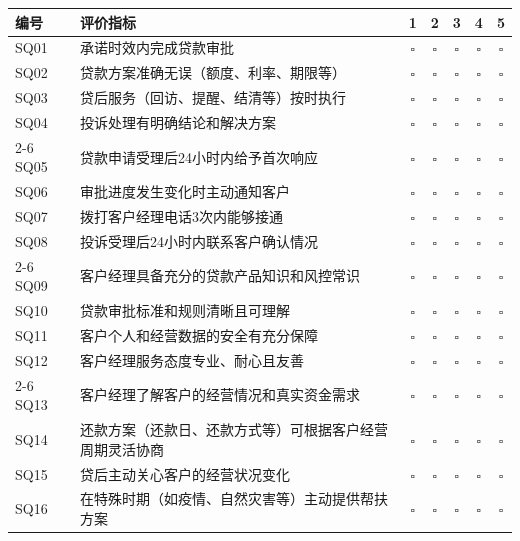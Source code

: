 \begin{center}
\begin{tabularx}{\textwidth}{l X c c c c c}
  \toprule
  \textbf{编号} & \textbf{评价指标} & \textbf{1} & \textbf{2} & \textbf{3} & \textbf{4} & \textbf{5} \\
  \midrule
  SQ01 & 承诺时效内完成贷款审批 & $\square$ & $\square$ & $\square$ & $\square$ & $\square$ \\
  SQ02 & 贷款方案准确无误（额度、利率、期限等） & $\square$ & $\square$ & $\square$ & $\square$ & $\square$ \\
  SQ03 & 贷后服务（回访、提醒、结清等）按时执行 & $\square$ & $\square$ & $\square$ & $\square$ & $\square$ \\
  SQ04 & 投诉处理有明确结论和解决方案 & $\square$ & $\square$ & $\square$ & $\square$ & $\square$ \\
  \cmidrule{2-6}
  SQ05 & 贷款申请受理后24小时内给予首次响应 & $\square$ & $\square$ & $\square$ & $\square$ & $\square$ \\
  SQ06 & 审批进度发生变化时主动通知客户 & $\square$ & $\square$ & $\square$ & $\square$ & $\square$ \\
  SQ07 & 拨打客户经理电话3次内能够接通 & $\square$ & $\square$ & $\square$ & $\square$ & $\square$ \\
  SQ08 & 投诉受理后24小时内联系客户确认情况 & $\square$ & $\square$ & $\square$ & $\square$ & $\square$ \\
  \cmidrule{2-6}
  SQ09 & 客户经理具备充分的贷款产品知识和风控常识 & $\square$ & $\square$ & $\square$ & $\square$ & $\square$ \\
  SQ10 & 贷款审批标准和规则清晰且可理解 & $\square$ & $\square$ & $\square$ & $\square$ & $\square$ \\
  SQ11 & 客户个人和经营数据的安全有充分保障 & $\square$ & $\square$ & $\square$ & $\square$ & $\square$ \\
  SQ12 & 客户经理服务态度专业、耐心且友善 & $\square$ & $\square$ & $\square$ & $\square$ & $\square$ \\
  \cmidrule{2-6}
  SQ13 & 客户经理了解客户的经营情况和真实资金需求 & $\square$ & $\square$ & $\square$ & $\square$ & $\square$ \\
  SQ14 & 还款方案（还款日、还款方式等）可根据客户经营周期灵活协商 & $\square$ & $\square$ & $\square$ & $\square$ & $\square$ \\
  SQ15 & 贷后主动关心客户的经营状况变化 & $\square$ & $\square$ & $\square$ & $\square$ & $\square$ \\
  SQ16 & 在特殊时期（如疫情、自然灾害等）主动提供帮扶方案 & $\square$ & $\square$ & $\square$ & $\square$ & $\square$ \\

\end{tabularx}
\end{center}

